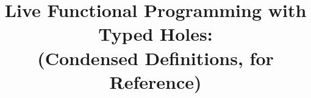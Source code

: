 \documentclass[acmsmall,review,anonymous]{acmart}\settopmatter{printfolios=false,printccs=false,printacmref=false}
\begin{document}
\title{Live Functional Programming with Typed Holes:
  \\
  (Condensed Definitions, for Reference)
}










\end{document}

